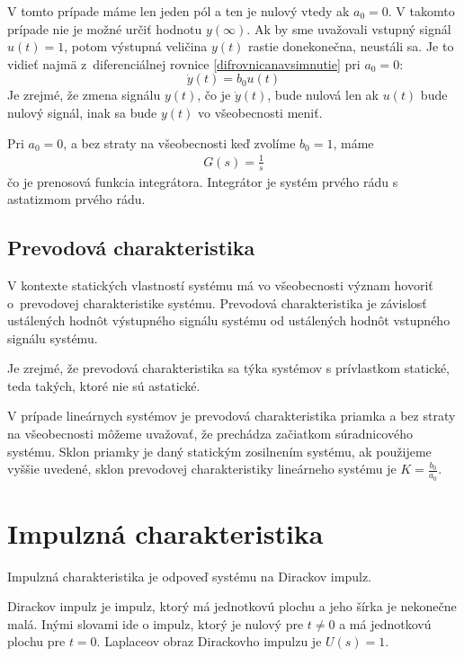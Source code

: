 \documentclass[a4paper, 10pt, ]{article}
\begin{document}
V tomto prípade máme len jeden pól a ten je nulový vtedy ak $a_0 = 0$. V takomto prípade nie je možné určiť hodnotu $y(\infty)$. Ak by sme uvažovali vstupný signál $u(t) = 1$, potom výstupná veličina $y(t)$ rastie donekonečna, neustáli sa. Je to vidieť najmä z~diferenciálnej rovnice \eqref{difrovnicanavsimnutie} pri $a_0 = 0$:
\begin{equation}
    \dot y(t) = b_0 u(t)
\end{equation}
Je zrejmé, že zmena signálu $y(t)$, čo je $\dot y(t)$, bude nulová len ak $u(t)$ bude nulový signál, inak sa bude $y(t)$ vo všeobecnosti meniť.

Pri $a_0 = 0$, a bez straty na všeobecnosti keď zvolíme $b_0 = 1$, máme
\begin{align}
    G(s) = \frac{1}{s}
\end{align}
čo je prenosová funkcia integrátora. Integrátor je systém prvého rádu s astatizmom prvého rádu.


\subsection{Prevodová charakteristika}

V kontexte statických vlastností systému má vo všeobecnosti význam hovoriť o~prevodovej charakteristike systému. Prevodová charakteristika je závislosť ustálených hodnôt výstupného signálu systému od ustálených hodnôt vstupného signálu systému.

Je zrejmé, že prevodová charakteristika sa týka systémov s prívlastkom statické, teda takých, ktoré nie sú astatické.

V prípade lineárnych systémov je prevodová charakteristika priamka a bez straty na všeobecnosti môžeme uvažovať, že prechádza začiatkom súradnicového systému. Sklon priamky je daný statickým zosilnením systému, ak použijeme vyššie uvedené, sklon prevodovej charakteristiky lineárneho systému je $K = \frac{b_0}{a_0}$.



\section{Impulzná charakteristika}

Impulzná charakteristika je odpoveď systému na Dirackov impulz.

\bigskip

Dirackov impulz je impulz, ktorý má jednotkovú plochu a jeho šírka je nekonečne malá. Inými slovami ide o impulz, ktorý je nulový pre $t \neq 0$ a má jednotkovú plochu pre $t = 0$. Laplaceov obraz Dirackovho impulzu je $U(s) = 1$.
\end{document}
